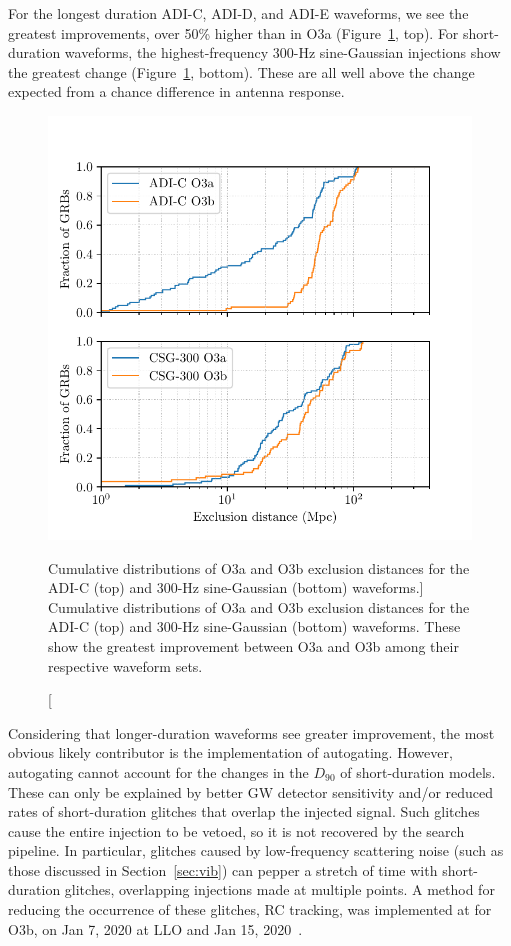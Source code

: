 For the longest duration ADI-C, ADI-D, and ADI-E waveforms, we see the greatest improvements, over 50\% higher than in O3a (Figure~\ref{fig:grb-o3b-compare-o3a}, top).
For short-duration waveforms, the highest-frequency 300-Hz sine-Gaussian injections show the greatest change (Figure~\ref{fig:grb-o3b-compare-o3a}, bottom).
These are all well above the change expected from a chance difference in antenna response.

\begin{figure}[h]
  \centering
  \includegraphics{figures/grb/compare-o3a.pdf}
  \caption
	[Cumulative distributions of O3a and O3b exclusion distances for the ADI-C (top) and 300-Hz sine-Gaussian (bottom) waveforms.]
	{Cumulative distributions of O3a and O3b exclusion distances for the ADI-C (top) and 300-Hz sine-Gaussian (bottom) waveforms.
	These show the greatest improvement between O3a and O3b among their respective waveform sets.}
  \label{fig:grb-o3b-compare-o3a}
\end{figure}

Considering that longer-duration waveforms see greater improvement, the most obvious likely contributor is the implementation of autogating.
However, autogating cannot account for the changes in the $D_{90}$ of short-duration models.
These can only be explained by better GW detector sensitivity and/or reduced rates of short-duration glitches that overlap the injected signal.
Such glitches cause the entire injection to be vetoed, so it is not recovered by the search pipeline.
In particular, glitches caused by low-frequency scattering noise (such as those discussed in Section~\ref{sec:vib}) can pepper a stretch of time with short-duration glitches, overlapping injections made at multiple points.
A method for reducing the occurrence of these glitches, \ac{RC} tracking, was implemented at for O3b, on Jan 7, 2020 at \ac{LLO} and Jan 15, 2020~\citep{Soni_2020}.

